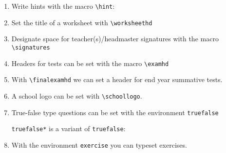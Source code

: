 \documentclass[12pt,a4page]{article}
\def\cellwidth{0.4\textwidth}
\newcommand{\miniexample}[3][t]{%
  \parbox[#1][#3][t]{\cellwidth}{#2}
}
\newcommand{\codeexample}[3][c]{%
  \colorbox[HTML]{b0c4be}{\miniexample[#1]{}{#3}}
}
\newcommand{\textexample}[3][c]{%
  {\footnotesize
    \colorbox[gray]{0.9}{\miniexample[#1]{}{#3}}%
  }
}
\newcommand{\examplerow}[3][10pt]{%
  \par\noindent\strut\hfill\codeexample{#2}{#3}\hspace{#1}\textexample{#2}{#3}\hfill\strut
}
\newlength{\exheight}
\begin{document}
\begin{enumerate}
  \newpage

\item Write hints with the macro \verb|\hint|:
  \setlength{\exheight}{180pt}
  \examplerow{exampleMacroHint.tex}{\exheight}
\item Set the title of a worksheet with \verb|\worksheethd|
  \setlength{\exheight}{70pt}
  \examplerow{exampleMacroWorksheethd.tex}{\exheight}
\item Designate space for teacher(s)/headmaster signatures with the macro
  \verb|\signatures|
  \setlength{\exheight}{72pt}
  \setlength{\signatureslength}{80pt}
  \setlength{\signaturelineskip}{25pt}
  \examplerow{exampleMacroSignatures.tex}{\exheight}
\item Headers for tests can be set with the macro \verb|\examhd|
  \setlength{\exheight}{67pt}
  \examplerow{exampleMacroExamhd.tex}{\exheight}
\item With \verb|\finalexamhd| we can set a header for end year summative tests.
  \setlength{\exheight}{39pt}
  \examplerow{exampleMacroFinalExamhd.tex}{\exheight}

  \newpage

\item A school logo can be set with \verb|\schoollogo|.
  \setlength{\exheight}{62pt}
  \examplerow{exampleMacroSchoollogo.tex}{\exheight}
\item True-false type questions can be set with the environment \verb|truefalse|\\
  \setlength{\exheight}{85pt}
  \setlength{\truefalselength}{20pt}
  \examplerow{exampleEnvirTruefalse01.tex}{\exheight}
\noindent \verb|truefalse*| is a variant of \verb|truefalse|:
\setlength{\exheight}{95pt}
\setlength{\truefalselength}{30pt} 
\examplerow{exampleEnvirTruefalse02.tex}{\exheight}
\item With the environment \texttt{exercise} you can typeset exercises.
  \setlength{\exheight}{193pt}
  \examplerow{exampleEnvirExercise.tex}{\exheight}


\end{enumerate}
\end{document}
